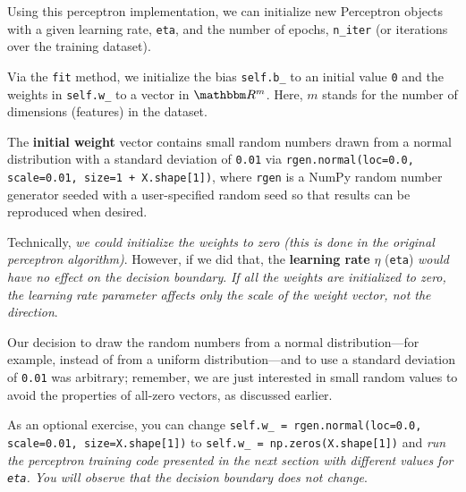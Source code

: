 \documentclass[../machine_learning_scikit.tex]{subfiles}
\begin{document}
    \begin{obs}
        Using this perceptron implementation, we can initialize new Perceptron objects with a given learning rate, \lstinline|eta|, and the number of epochs, \lstinline|n_iter| (or iterations over the training dataset).
    \end{obs}

    Via the \lstinline|fit| method, we initialize the bias \lstinline|self.b_| to an initial value \lstinline|0| and the weights in \lstinline|self.w_| to a vector in $\bbm{R^m}$. Here, $m$ stands for the number of dimensions (features) in the dataset.

    \begin{obs}
        The \textbf{initial weight} vector contains small random numbers drawn from a normal distribution with a standard deviation of \lstinline|0.01| via \lstinline|rgen.normal(loc=0.0, scale=0.01, size=1 + X.shape[1])|, where \lstinline|rgen| is a NumPy random number generator seeded with a user-specified random seed so that results can be reproduced when desired.
    \end{obs}

    Technically, \textit{we could initialize the weights to zero (this is done in the original perceptron algorithm)}. However, if we did that, the \textbf{learning rate} $\eta$ (\lstinline|eta|) \textit{would have no effect on the decision boundary}. \textit{If all the weights are initialized to zero, the learning rate parameter affects only the scale of the weight vector, not the direction}. 

    \begin{obs}
        Our decision to draw the random numbers from a normal distribution—for example, instead of from a uniform distribution—and to use a standard deviation of \lstinline|0.01| was arbitrary; remember, we are just interested in small random values to avoid the properties of all-zero vectors, as discussed earlier.
    \end{obs}

    \begin{excer}
        As an optional exercise, you can change \lstinline|self.w_ = rgen.normal(loc=0.0, scale=0.01, size=X.shape[1])| to \lstinline|self.w_ = np.zeros(X.shape[1])| and \textit{run the perceptron training code presented in the next section with different values for \lstinline|eta|. You will observe that the decision boundary does not change}.
    \end{excer}
\end{document}
